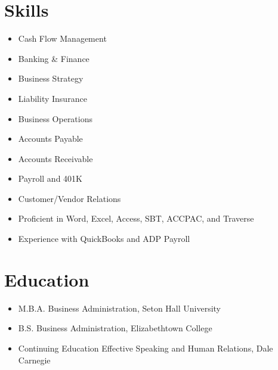 \documentclass[11pt]{article}
\begin{document}
\vspace{12pt}

\section{Skills}

\begin{itemize}[leftmargin=*,labelsep=0.5cm]
\item Cash Flow Management
\item Banking \& Finance
\item Business Strategy
\item Liability Insurance
\item Business Operations
\item Accounts Payable
\item Accounts Receivable
\item Payroll and 401K
\item Customer/Vendor Relations
\item Proficient in Word, Excel, Access, SBT, ACCPAC, and Traverse
\item Experience with QuickBooks and ADP Payroll
\end{itemize}

\vspace{12pt}

\section{Education}

\begin{itemize}[leftmargin=*,labelsep=0.5cm]
\item M.B.A. Business Administration, Seton Hall University
\item B.S. Business Administration, Elizabethtown College
\item Continuing Education Effective Speaking and Human Relations, Dale Carnegie
\end{itemize}
\end{document}
